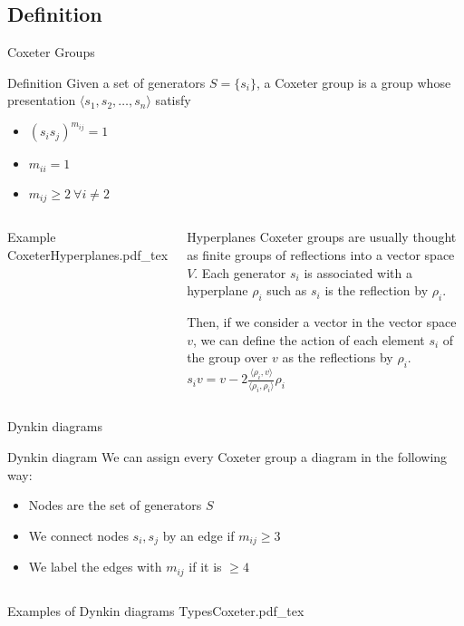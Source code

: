 \documentclass{beamer}
\newcommand{\incfig}[1]{%
\center
\def\svgwidth{0.9\columnwidth}
{#1.pdf_tex}
}
\begin{document}
\subsection{Definition}
\begin{frame}{Coxeter Groups}
  \begin{block}{Definition}
    Given a set of generators $S = \{s_i\}$, a Coxeter group is a group whose presentation $\langle s_1, s_2, \ldots, s_n  \rangle $ satisfy
\begin{itemize}[topsep=-6pt, itemsep=0pt]
  \item $(s_is_j)^{m_{ij}} = 1$
  \item $m_{ii} = 1$
  \item $m_{ij}\ge 2 \ \forall i\neq 2$
\end{itemize}
  \end{block}
\begin{columns}[c]
\begin{block}{Example}
\incfig{CoxeterHyperplanes}
\end{block}
\begin{block}{Hyperplanes}
Coxeter groups are usually thought as finite groups of reflections into a vector space $V$. Each generator $s_i$ is associated with a hyperplane $\rho_i$ such as $s_i$ is the reflection by $\rho _i$.

Then, if we consider a vector in the vector space $v$, we can define the action of each element $s_i$ of the group over $v$ as the reflections by $\rho _i$. $s_iv = v - 2\frac{\langle \rho_i, v \rangle }{\langle \rho _i, \rho _i \rangle}\rho _i$
\end{block}
\end{columns}
\end{frame}

\begin{frame}{Dynkin diagrams}

\begin{block}{Dynkin diagram}
 We can assign every Coxeter group a diagram in the following way:
 \begin{itemize}[topsep=-6pt, itemsep=0pt]
   \item Nodes are the set of generators $S$
   \item We connect nodes $s_i, s_j$ by an edge if $m_{ij}\ge 3$
   \item We label the edges with  $m_{ij}$ if it is $\ge 4$
 \end{itemize}
\end{block}
  \begin{columns}[c]
\begin{block}{Examples of Dynkin diagrams} 
  \incfig{TypesCoxeter}
\end{block}
  \end{columns}

\end{frame}
\end{document}
